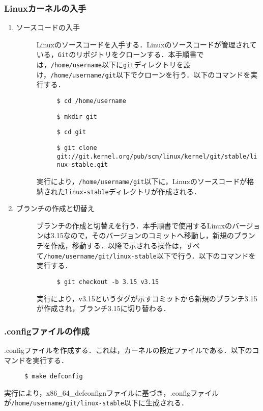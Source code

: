 \documentclass[12pt]{jsarticle}
\begin{document}
\subsubsection{Linuxカーネルの入手}
\begin{enumerate}
\item[] ソースコードの入手
  \begin{description}
  \item[] Linuxのソースコードを入手する．Linuxのソースコードが管理されている，\verb|Git|のリポジトリをクローンする．本手順書では，\verb|/home/username|以下に\verb|git|ディレクトリを設け，\verb|/home/username/git|以下でクローンを行う．以下のコマンドを実行する．
    \begin{description}
    \item[] \verb|$ cd /home/username|
    \item[] \verb|$ mkdir git|
    \item[] \verb|$ cd git|
    \item[] \verb|$ git clone git://git.kernel.org/pub/scm/linux/kernel/git/stable/linux-stable.git|
    \end{description}
  \item[] 実行により，\verb|/home/username/git|以下に，Linuxのソースコードが格納された\verb|linux-stable|ディレクトリが作成される．
  \end{description}
\item[] ブランチの作成と切替え
  \begin{description}
  \item[] ブランチの作成と切替えを行う．本手順書で使用するLinuxのバージョンは3.15なので，そのバージョンのコミットへ移動し，新規のブランチを作成，移動する．以降で示される操作は，すべて\verb|/home/username/git/linux-stable|以下で行う．以下のコマンドを実行する．
    \begin{description}
    \item[] \verb|$ git checkout -b 3.15 v3.15|
    \end{description}
  \item[] 実行により，v3.15というタグが示すコミットから新規のブランチ3.15が作成され，ブランチ3.15に切り替わる．
  \end{description}
\end{enumerate}

\subsubsection{.configファイルの作成}
.configファイルを作成する．これは，カーネルの設定ファイルである．以下のコマンドを実行する．
\begin{description}
\item[] \verb|$ make defconfig|
\end{description}
実行により，x86\_64\_defconfignファイルに基づき，.configファイルが\verb|/home/username/git/linux-stable|以下に生成される．
\end{document}
